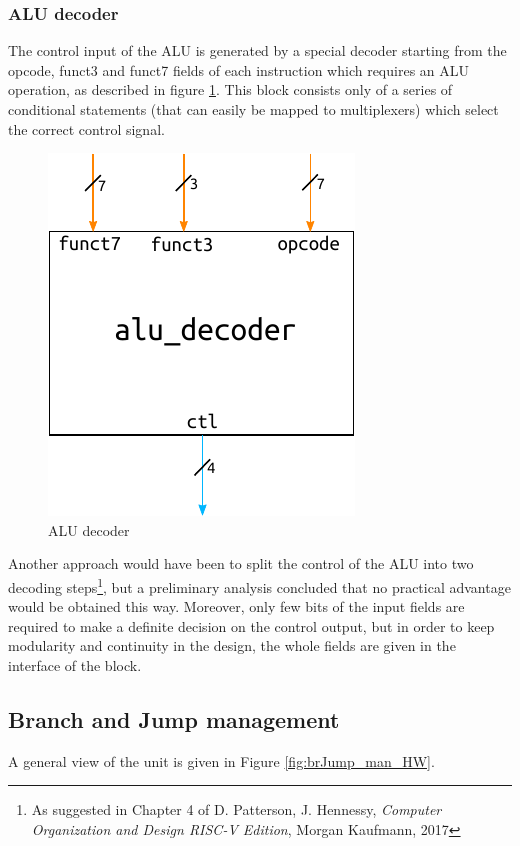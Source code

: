 \documentclass[a4paper]{article}
\begin{document}
\subsubsection{ALU decoder}
The control input of the ALU is generated by a special decoder starting from the opcode, funct3 and funct7 fields of each instruction which requires an ALU operation, as described in figure \ref{fig:alu_dec}. This block consists only of a series of conditional statements (that can easily be mapped to multiplexers) which select the correct control signal.

\begin{figure}[hbtp]
    \centering
    \includegraphics[]{../alu/ref/schematic/alu_dec.pdf}
    \caption{ALU decoder}
    \label{fig:alu_dec}
\end{figure}

Another approach would have been to split the control of the ALU into two decoding steps\footnote{As suggested in Chapter 4 of D. Patterson, J. Hennessy, \emph{Computer Organization and Design RISC-V Edition}, Morgan Kaufmann, 2017}, but a preliminary analysis concluded that no practical advantage would be obtained this way.
Moreover, only few bits of the input fields are required to make a definite decision on the control output, but in order to keep modularity and continuity in the design, the whole fields are given in the interface of the block.

\subsection{Branch and Jump management}
A general view of the unit is given in Figure \ref{fig:brJump_man_HW}.
\end{document}
